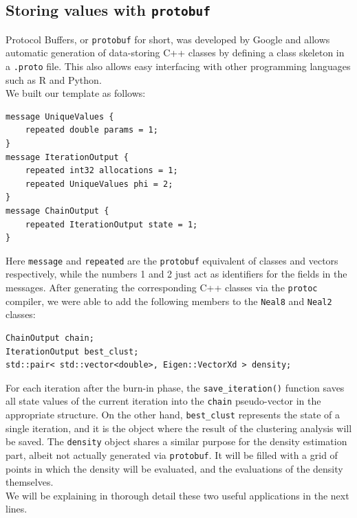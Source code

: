 \subsection{Storing values with \texttt{protobuf}}
Protocol Buffers, or \verb|protobuf| for short, was developed by Google and allows automatic generation of data-storing C++ classes by defining a class skeleton in a \verb|.proto| file.
This also allows easy interfacing with other programming languages such as R and Python. \\
We built our template as follows:
\begin{verbatim}
message UniqueValues {
    repeated double params = 1;
}
message IterationOutput {
    repeated int32 allocations = 1;
    repeated UniqueValues phi = 2;
}
message ChainOutput {
    repeated IterationOutput state = 1;
}
\end{verbatim}
Here \verb|message| and \verb|repeated| are the \verb|protobuf| equivalent of classes and vectors respectively, while the numbers 1 and 2 just act as identifiers for the fields in the messages.
After generating the corresponding C++ classes via the \verb|protoc| compiler, we were able to add the following members to the \verb|Neal8| and \verb|Neal2| classes:
\begin{verbatim}
ChainOutput chain;
IterationOutput best_clust;
std::pair< std::vector<double>, Eigen::VectorXd > density;
\end{verbatim}
For each iteration after the burn-in phase, the \verb|save_iteration()| function saves all state values of the current iteration into the \verb|chain| pseudo-vector in the appropriate structure.
On the other hand, \verb|best_clust| represents the state of a single iteration, and it is the object where the result of the clustering analysis will be saved.
The \verb|density| object shares a similar purpose for the density estimation part, albeit not actually generated via \verb|protobuf|.
It will be filled with a grid of points in which the density will be evaluated, and the evaluations of the density themselves. \\
We will be explaining in thorough detail these two useful applications in the next lines.

